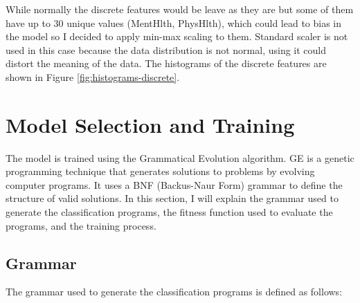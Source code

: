 \documentclass{article}
\begin{document}
While normally the discrete features would be leave as they are but some of them have up to 30 unique values (MentHlth, PhysHlth), which could lead to bias in the model so I decided to apply min-max scaling to them.
Standard scaler is not used in this case because the data distribution is not normal, using it could distort the meaning of the data.
The histograms of the discrete features are shown in Figure \ref{fig:histograms-discrete}.


\section{Model Selection and Training}
The model is trained using the Grammatical Evolution algorithm.
GE is a genetic programming technique that generates solutions to problems by evolving computer programs. 
It uses a BNF (Backus-Naur Form) grammar to define the structure of valid solutions.
In this section, I will explain the grammar used to generate the classification programs, the fitness function used to evaluate the programs, and the training process.

    \subsection{Grammar}
    The grammar used to generate the classification programs is defined as follows:
\end{document}
